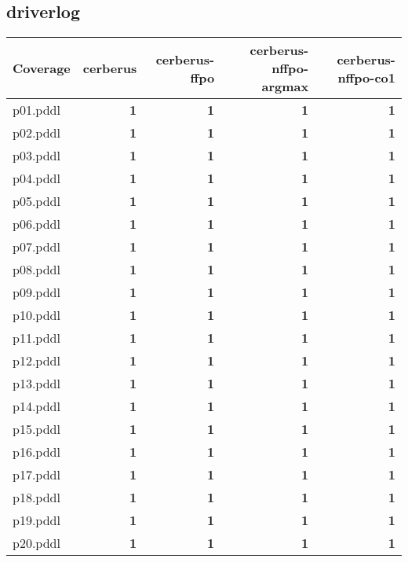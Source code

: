 \documentclass{article}
\begin{document}
\hypertarget{coverage-driverlog}{}
\subsection*{driverlog}

\begin{tabular}{@{}lrrrr@{}}
Coverage & cerberus & cerberus-ffpo & cerberus-nffpo-argmax & cerberus-nffpo-co1 \\
\midrule
p01.pddl & \textbf{1} & \textbf{1} & \textbf{1} & \textbf{1} \\
p02.pddl & \textbf{1} & \textbf{1} & \textbf{1} & \textbf{1} \\
p03.pddl & \textbf{1} & \textbf{1} & \textbf{1} & \textbf{1} \\
p04.pddl & \textbf{1} & \textbf{1} & \textbf{1} & \textbf{1} \\
p05.pddl & \textbf{1} & \textbf{1} & \textbf{1} & \textbf{1} \\
p06.pddl & \textbf{1} & \textbf{1} & \textbf{1} & \textbf{1} \\
p07.pddl & \textbf{1} & \textbf{1} & \textbf{1} & \textbf{1} \\
p08.pddl & \textbf{1} & \textbf{1} & \textbf{1} & \textbf{1} \\
p09.pddl & \textbf{1} & \textbf{1} & \textbf{1} & \textbf{1} \\
p10.pddl & \textbf{1} & \textbf{1} & \textbf{1} & \textbf{1} \\
p11.pddl & \textbf{1} & \textbf{1} & \textbf{1} & \textbf{1} \\
p12.pddl & \textbf{1} & \textbf{1} & \textbf{1} & \textbf{1} \\
p13.pddl & \textbf{1} & \textbf{1} & \textbf{1} & \textbf{1} \\
p14.pddl & \textbf{1} & \textbf{1} & \textbf{1} & \textbf{1} \\
p15.pddl & \textbf{1} & \textbf{1} & \textbf{1} & \textbf{1} \\
p16.pddl & \textbf{1} & \textbf{1} & \textbf{1} & \textbf{1} \\
p17.pddl & \textbf{1} & \textbf{1} & \textbf{1} & \textbf{1} \\
p18.pddl & \textbf{1} & \textbf{1} & \textbf{1} & \textbf{1} \\
p19.pddl & \textbf{1} & \textbf{1} & \textbf{1} & \textbf{1} \\
p20.pddl & \textbf{1} & \textbf{1} & \textbf{1} & \textbf{1} \\
\end{tabular}
\end{document}
